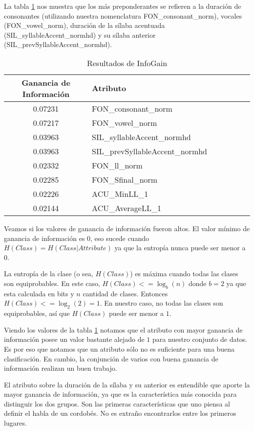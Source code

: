 La tabla \ref{infogain-table} nos muestra que los más preponderantes se refieren a la duración de consonantes (utilizando nuestra nomenclatura FON\_consonant\_norm), vocales (FON\_vowel\_norm), duración de la sílaba acentuada (SIL\_syllableAccent\_\-normhd) y su sílaba anterior \\ (SIL\_prevSyllableAccent\_normhd). 	 

\begin{table}[H]
\centering
\begin{tabular}{|c|l|c|c|c|c|c|}
\hline
\textbf{Ganancia de Información} & \textbf{Atributo} \\ \hline
 0.07231     & FON\_consonant\_norm \\ \hline
 0.07217     & FON\_vowel\_norm \\ \hline
 0.03963     & SIL\_syllableAccent\_normhd \\ \hline
 0.03963     & SIL\_prevSyllableAccent\_normhd \\ \hline
 0.02332     & FON\_ll\_norm \\ \hline
 0.02285     & FON\_Sfinal\_norm \\ \hline
 0.02226     & ACU\_MinLL\_1 \\ \hline
 0.02144     & ACU\_AverageLL\_1 \\ \hline
\end{tabular}
\caption{Resultados de InfoGain}
\label{infogain-table}
\end{table}

Veamos si los valores de ganancia de información fueron altos. El valor mínimo de ganancia de información es $0$, eso sucede cuando $H(Class) = H(Class | Attribute)$ ya que la entropía nunca puede ser menor a $0$.

La entropía de la clase (o sea, $H(Class)$) es máxima cuando todas las clases son equiprobables. En este caso, $H(Class) <= \log_b (n)$ donde $b = 2$ ya que esta calculada en bits y $n$ cantidad de clases. Entonces $H(Class) <= \log_2 (2) = 1$. En nuestro caso, no todas las clases son equiprobables, así que $H(Class)$ puede ser menor a $1$.

Viendo los valores de la tabla \ref{infogain-table} notamos que el atributo con mayor ganancia de información posee un valor bastante alejado de $1$ para nuestro conjunto de datos. Es por eso que notamos que un atributo sólo no es suficiente para una buena clasificación. En cambio, la conjunción de varios con buena ganancia de información realizan un buen trabajo.

El atributo sobre la duración de la sílaba y su anterior es entendible que aporte la mayor ganancia de información, ya que es la característica más conocida para distinguir los dos grupos. Son las primeras características que uno piensa al definir el habla de un cordobés. No es extraño encontrarlos entre los primeros lugares. 

